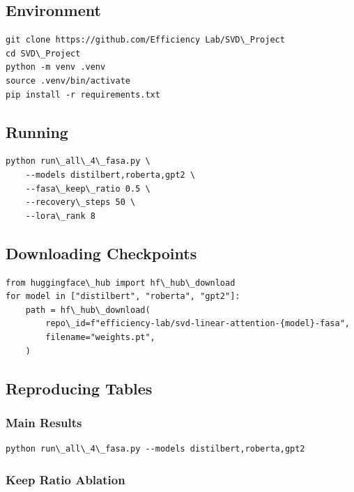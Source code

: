 \subsection{Environment}

\begin{lstlisting}
git clone https://github.com/Efficiency Lab/SVD\_Project
cd SVD\_Project
python -m venv .venv
source .venv/bin/activate
pip install -r requirements.txt
\end{lstlisting}

\subsection{Running}

\begin{lstlisting}
python run\_all\_4\_fasa.py \
    --models distilbert,roberta,gpt2 \
    --fasa\_keep\_ratio 0.5 \
    --recovery\_steps 50 \
    --lora\_rank 8
\end{lstlisting}

\subsection{Downloading Checkpoints}

\begin{lstlisting}
from huggingface\_hub import hf\_hub\_download
for model in ["distilbert", "roberta", "gpt2"]:
    path = hf\_hub\_download(
        repo\_id=f"efficiency-lab/svd-linear-attention-{model}-fasa",
        filename="weights.pt",
    )
\end{lstlisting}

\subsection{Reproducing Tables}

\subsubsection{Main Results}

\begin{lstlisting}
python run\_all\_4\_fasa.py --models distilbert,roberta,gpt2
\end{lstlisting}

\subsubsection{Keep Ratio Ablation}

